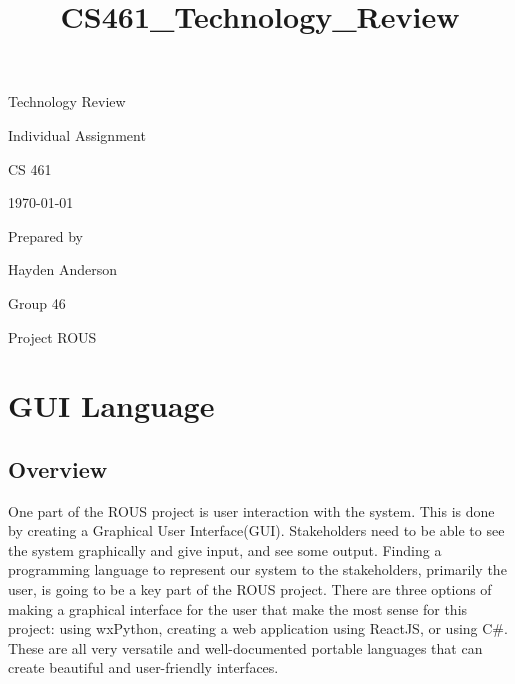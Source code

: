 \documentclass[onecolumn, draftclsnofoot,10pt, compsoc]{IEEEtran}
\title{CS461_Technology_Review}
\begin{document}
\begin{titlepage}
    \begin{singlespace}
		\hfill  
        \vfill
        \centering
        \scshape{
            {\Huge Technology Review}\par\vspace{.2in}
            {\LARGE Individual Assignment}\par\vspace{.2in}
            {\LARGE CS 461}\par\vspace{.2in}
            {\large\today}\par
            \vspace{1in}
           	{\large Prepared by }\par
            {\LARGE Hayden Anderson\par}
            {\large	Group 46\par
           			Project ROUS\par}
            \vspace{5pt}
            \vfill
        }    
    \end{singlespace}
    \begin{abstract}

	\end{abstract}
\end{titlepage}



\newpage
{}
\tableofcontents
\newpage


\section{GUI Language}
\subsection{Overview}
One part of the ROUS project is user interaction with the system. This is done by creating a Graphical User Interface(GUI). Stakeholders need to be able to see the system graphically and give input, and see some output. Finding a programming language to represent our system to the stakeholders, primarily the user, is going to be a key part of the ROUS project. There are three options of making a graphical interface for the user that make the most sense for this project: using wxPython, creating a web application using ReactJS, or using C\#. These are all very versatile and well-documented portable languages that can create beautiful and user-friendly interfaces.
\end{document}
